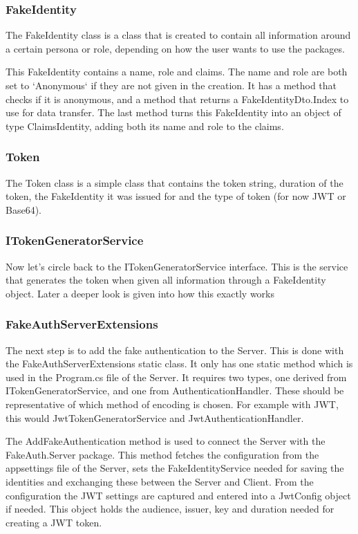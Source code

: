 \subsubsection{FakeIdentity}

The FakeIdentity class is a class that is created to contain all information around a certain persona or role, depending on how the user wants to use the packages.

This FakeIdentity contains a name, role and claims. The name and role are both set to `Anonymous` if they are not given in the creation. It has a method that checks if it is anonymous, and a method that returns a FakeIdentityDto.Index to use for data transfer. The last method turns this FakeIdentity into an object of type ClaimsIdentity, adding both its name and role to the claims.

\subsubsection{Token}

The Token class is a simple class that contains the token string, duration of the token, the FakeIdentity it was issued for and the type of token (for now JWT or Base64).

\subsubsection{ITokenGeneratorService}

Now let's circle back to the ITokenGeneratorService interface. This is the service that generates the token when given all information through a FakeIdentity object. Later a deeper look is given into how this exactly works

\subsubsection{FakeAuthServerExtensions}

The next step is to add the fake authentication to the Server. This is done with the FakeAuthServerExtensions static class. It only has one static method which is used in the Program.cs file of the Server. It requires two types, one derived from ITokenGeneratorService, and one from AuthenticationHandler. These should be representative of which method of encoding is chosen. For example with JWT, this would JwtTokenGeneratorService and JwtAuthenticationHandler.

The AddFakeAuthentication method is used to connect the Server with the FakeAuth.Server package. This method fetches the configuration from the appsettings file of the Server, sets the FakeIdentityService needed for saving the identities and exchanging these between the Server and Client. From the configuration the JWT settings are captured and entered into a JwtConfig object if needed. This object holds the audience, issuer, key and duration needed for creating a JWT token.

